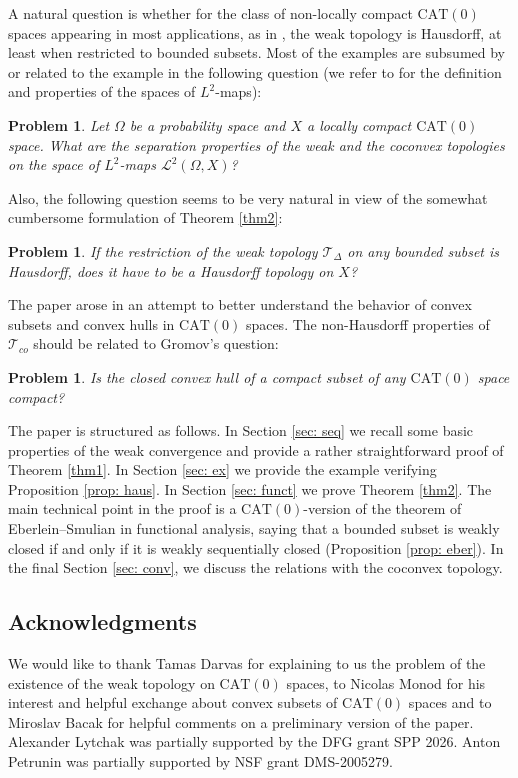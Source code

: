 \documentclass[12pt,leqno]{amsart}
\numberwithin{equation}{section}
\newtheorem{quest}[thm]{Problem}
\theoremstyle{remark}
\newcommand{\CAT}{\mathrm{CAT}}
\begin{document}
A natural question is whether for the class of non-locally compact $\CAT(0)$ spaces appearing in most applications, as in \cite{Monod,Streets,Darvas,Clarke,Clarke2}, the weak topology is Hausdorff, at least when restricted to bounded subsets. Most of the examples are subsumed by or related to the example in the following question (we refer to \cite{Monod} for the definition and properties of the spaces of $L^2$-maps):

\begin{quest}
	Let $\Omega$ be a probability space and $X$ a locally compact $\CAT(0)$ space. What are the separation properties of the weak and the coconvex topologies on the space of $L^2$-maps $\mathcal L^2 (\Omega, X)$?
\end{quest}

Also, the following question seems to be very natural in view of the somewhat cumbersome formulation of Theorem \ref{thm2}:

\begin{quest}
	If the restriction of the weak topology $\mathcal T_{\Delta}$ on any bounded subset is Hausdorff, does it have to be a Hausdorff topology on $X$?
\end{quest} 

The paper arose in an attempt to better understand the behavior of convex subsets and convex hulls in $\CAT(0)$ spaces. The non-Hausdorff properties of $\mathcal T_{co}$ should be related to Gromov's question:

\begin{quest}
Is the closed convex hull of a compact subset of any $\CAT(0)$ space compact?
\end{quest}

The paper is structured as follows. In Section \ref{sec: seq} we recall some basic properties of the weak convergence and provide a rather straightforward proof of Theorem \ref{thm1}. In Section \ref{sec: ex} we provide the example verifying Proposition \ref{prop: haus}.
In Section \ref{sec: funct} we prove Theorem \ref{thm2}. The main technical point in the proof is a $\CAT(0)$-version of the theorem of Eberlein--Smulian in functional analysis, saying that a bounded subset is weakly closed if and only if it is weakly sequentially closed (Proposition \ref{prop: eber}).
In the final Section \ref{sec: conv}, we discuss the relations with the coconvex topology. 

\subsection*{Acknowledgments}
We would like to thank Tamas Darvas for explaining to us the problem of the existence of the weak topology on 
$\CAT(0)$ spaces, to Nicolas Monod for his interest and helpful exchange about convex subsets of $\CAT (0)$ spaces and to Miroslav Bacak for helpful comments on a preliminary version of the paper. 
Alexander Lytchak was partially supported by the DFG grant SPP 2026.
Anton Petrunin was partially supported by NSF grant DMS-2005279.
\end{document}
